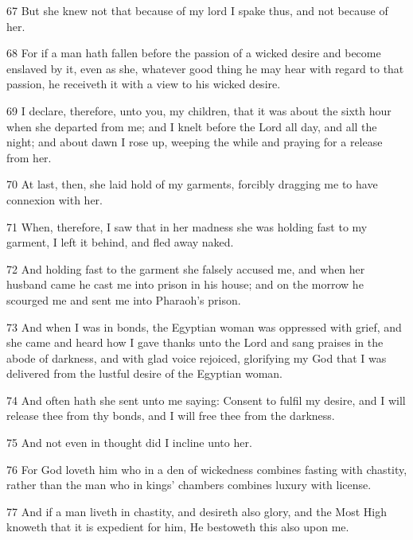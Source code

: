 \par 67 But she knew not that because of my lord I spake thus, and not because of her.

\par 68 For if a man hath fallen before the passion of a wicked desire and become enslaved by it, even as she, whatever good thing he may hear with regard to that passion, he receiveth it with a view to his wicked desire.

\par 69 I declare, therefore, unto you, my children, that it was about the sixth hour when she departed from me; and I knelt before the Lord all day, and all the night; and about dawn I rose up, weeping the while and praying for a release from her.

\par 70 At last, then, she laid hold of my garments, forcibly dragging me to have connexion with her.

\par 71 When, therefore, I saw that in her madness she was holding fast to my garment, I left it behind, and fled away naked.

\par 72 And holding fast to the garment she falsely accused me, and when her husband came he cast me into prison in his house; and on the morrow he scourged me and sent me into Pharaoh's prison.

\par 73 And when I was in bonds, the Egyptian woman was oppressed with grief, and she came and heard how I gave thanks unto the Lord and sang praises in the abode of darkness, and with glad voice rejoiced, glorifying my God that I was delivered from the lustful desire of the Egyptian woman.

\par 74 And often hath she sent unto me saying: Consent to fulfil my desire, and I will release thee from thy bonds, and I will free thee from the darkness.

\par 75 And not even in thought did I incline unto her.

\par 76 For God loveth him who in a den of wickedness combines fasting with chastity, rather than the man who in kings' chambers combines luxury with license.

\par 77 And if a man liveth in chastity, and desireth also glory, and the Most High knoweth that it is expedient for him, He bestoweth this also upon me.

